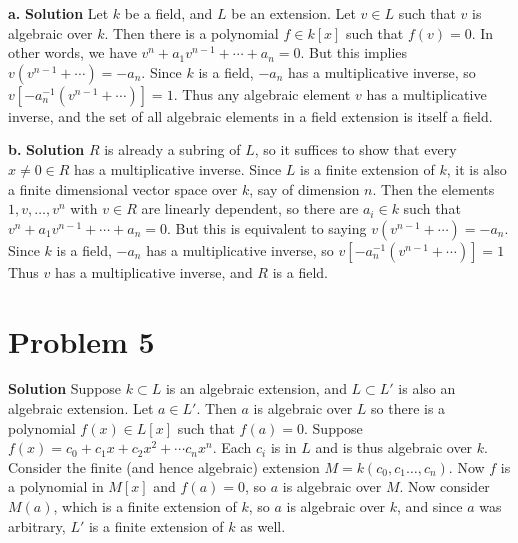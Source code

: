\documentclass{article}
\begin{document}
\textbf{a. } \textbf{Solution }Let $k$ be a field, and $L$ be an extension. Let $v \in L$ such that $v$ is algebraic over $k$. Then there is a polynomial $f \in k[x]$ such that $f(v) = 0$. In other words,
we have $v^n + a_1v^{n-1} + \cdots + a_n = 0  $. But this implies $v(v^{n-1} + \cdots) = -a_n$. Since $k$ is a field, $-a_n$ has a multiplicative inverse, so $v[-a_n^{-1}(v^{n-1} + \cdots)] = 1$.
Thus any algebraic element $v$ has a multiplicative inverse, and the set of all algebraic elements in a field extension is itself a field. 

\textbf{b. } \textbf{Solution } $R$ is already a subring of $L$, so it suffices to show that every $x \neq 0 \in R$ has a multiplicative inverse. Since $L$ is a finite extension of $k$,
it is also a finite dimensional vector space over $k$, say of dimension $n$. Then the elements $1, v, \ldots, v^n$ with $v \in R$ are linearly dependent, so there are $a_i \in k$ such that 
$v^n + a_1v^{n-1} + \cdots + a_n = 0  $. But this is equivalent to saying $v(v^{n-1} + \cdots) = -a_n$. Since $k$ is a field, $-a_n$ has a multiplicative inverse, so $v[-a_n^{-1}(v^{n-1} + \cdots)] = 1$
Thus $v$ has a multiplicative inverse, and $R$ is a field.

\section{Problem 5}
\textbf{Solution } Suppose $k \subset L$ is an algebraic extension, and $L \subset L'$ is also an algebraic extension. Let $a \in L'$. Then $a$ is algebraic over $L$ so there is 
a polynomial $f(x) \in L[x]$ such that $f(a) = 0$. Suppose $f(x) = c_0 + c_1 x +  c_2 x^2 + \cdots c_n x^n $. Each $c_i$ is in $L$ and is thus algebraic over $k$. Consider the finite (and hence algebraic) extension
$M = k(c_0, c_1 \ldots, c_n)$. Now $f$ is a polynomial in $M[x]$ and $f(a) = 0$, so $a$ is algebraic over $M$. Now consider $M(a)$, which is a finite extension of $k$, so $a$ is algebraic over $k$, 
and since $a$ was arbitrary, $L'$ is a finite extension of $k$ as well. 
\end{document}
